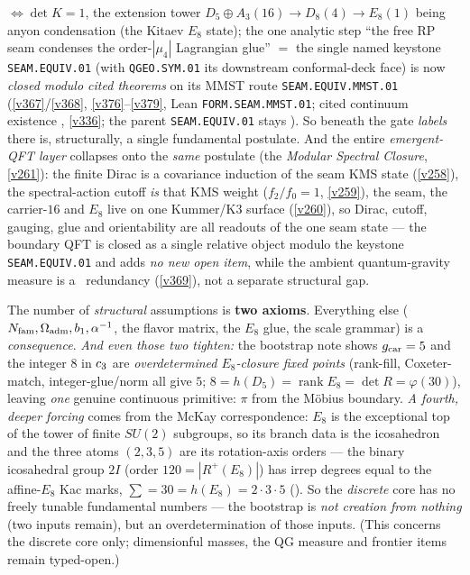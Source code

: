 $\Leftrightarrow\det K=1$, the extension tower $D_5{\oplus}A_3(16)\to D_8(4)\to E_8(1)$ being anyon
condensation (the Kitaev $E_8$ state); the one analytic step ``the free RP seam condenses the
order-$|\mu_4|$ Lagrangian glue'' $=$ the single named keystone \texttt{SEAM.EQUIV.01} (with
\texttt{QGEO.SYM.01} its downstream conformal-deck face) is now \emph{closed modulo cited theorems} on its MMST
route \texttt{SEAM.EQUIV.MMST.01}
(\vref{v367}/\vref{v368}, \vref{v376}--\vref{v379}, Lean \texttt{FORM.SEAM.MMST.01}; cited continuum existence \mO,
\vref{v336}; the parent \texttt{SEAM.EQUIV.01} stays \mO). So beneath the gate \emph{labels} there is,
structurally, a single fundamental postulate. And the entire \emph{emergent-QFT layer} collapses onto the
\emph{same} postulate (the \emph{Modular Spectral Closure}, \vref{v261}): the finite Dirac is a
covariance induction of the seam KMS state (\vref{v258}), the spectral-action cutoff \emph{is} that KMS
weight ($f_2/f_0=1$, \vref{v259}), the seam, the carrier-$16$ and $E_8$ live on one Kummer/K3 surface
(\vref{v260}), so Dirac, cutoff, gauging, glue and orientability are all readouts of the one seam state ---
the boundary QFT is closed as a single relative object modulo the keystone \texttt{SEAM.EQUIV.01} and adds
\emph{no new open item}, while the ambient quantum-gravity measure is a \mC\ redundancy (\vref{v369}), not a separate
structural gap.
 

\begin{winboxnb}
The number of \emph{structural} assumptions is \textbf{two axioms}. Everything else
($N_{\mathrm{fam}},\Omega_{\mathrm{adm}},b_1,\alpha^{-1}$, the flavor matrix, the $E_8$ glue, the scale grammar) is a
\emph{consequence}. \emph{And even those two tighten:} the
bootstrap note shows $g_{\mathrm{car}}=5$ and the integer $8$ in $c_3$ are \emph{overdetermined $E_8$-closure
fixed points} (rank-fill, Coxeter-match, integer-glue/norm all give $5$; $8=h(D_5)=\operatorname{rank}E_8=\det R=\varphi(30)$),
leaving \emph{one} genuine continuous primitive: $\pi$ from the Möbius boundary. \emph{A fourth, deeper
forcing} comes from the McKay correspondence: $E_8$ is the exceptional top of the tower of finite $SU(2)$
subgroups, so its branch data is the icosahedron and the three atoms $(2,3,5)$ are its rotation-axis orders
--- the binary icosahedral group $2I$ (order $120=|R^+(E_8)|$) has irrep degrees equal to the affine-$E_8$
Kac marks, $\sum=30=h(E_8)=2{\cdot}3{\cdot}5$ (). So the \emph{discrete}
core has no freely tunable fundamental numbers --- the bootstrap is \emph{not creation from nothing} (two
inputs remain), but an overdetermination of those inputs. (This concerns the discrete core only;
dimensionful masses, the QG measure and frontier items remain typed-open.)
   
\end{winboxnb}

